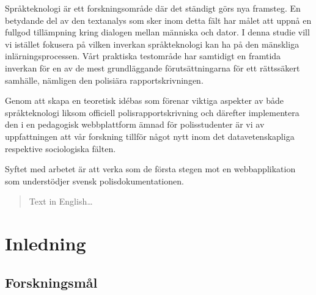 \documentclass[swedish]{maucsthesis}
\begin{document}

\author{Kalle Lindqvist \and Henrik Svensson}

\subject{datavetenskap}


\maketitle %

\begin{sammanfattning}
  Språkteknologi är ett forskningsområde där det ständigt görs nya framsteg. En
  betydande del av den textanalys som sker inom detta fält har målet att uppnå
  en fullgod tillämpning kring dialogen mellan människa och dator. I denna
  studie vill vi istället fokusera på vilken inverkan språkteknologi kan ha på
  den mänskliga inlärningsprocessen. Vårt praktiska testområde har samtidigt en
  framtida inverkan för en av de mest grundläggande förutsättningarna för ett
  rättssäkert samhälle, nämligen den polisiära rapportskrivningen.

  Genom att skapa en teoretisk idébas som förenar viktiga aspekter av både
  språkteknologi liksom officiell polisrapportskrivning och därefter
  implementera den i en pedagogisk webbplattform ämnad för polisstudenter är vi
  av uppfattningen att vår forskning tillför något nytt inom det
  datavetenskapliga respektive sociologiska fälten.

  Syftet med arbetet är att verka som de första stegen mot en webbapplikation
  som understödjer svensk polisdokumentationen.
\end{sammanfattning}

\begin{abstract}
Text in English\ldots
\end{abstract}

\ifodd\value{page}\else\mbox{}\newpage\fi
\tableofcontents
\newpage
\startpagecount

\section{Inledning}

\subsection{Forskningsmål}
\end{document}
